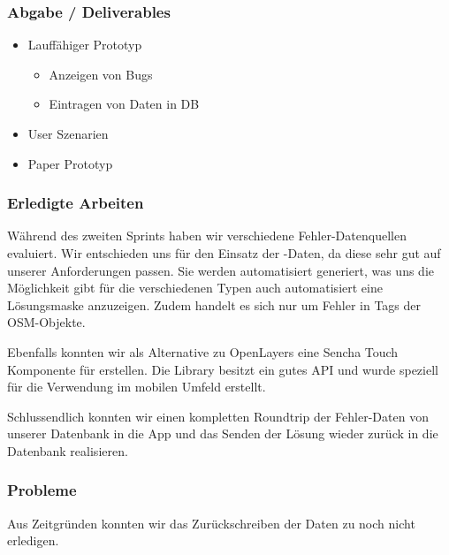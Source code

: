 \subsubsection{Abgabe / Deliverables}

\begin{itemize}
	\item Lauffähiger Prototyp
	\begin{itemize}
		\item Anzeigen von Bugs
		\item Eintragen von Daten in DB
	\end{itemize}
	\item User Szenarien
	\item Paper Prototyp
\end{itemize}

\subsubsection{Erledigte Arbeiten}
Während des zweiten Sprints haben wir verschiedene Fehler-Datenquellen evaluiert. Wir entschieden uns für den Einsatz der -Daten, da diese sehr gut auf unserer Anforderungen passen. Sie werden automatisiert generiert, was uns die Möglichkeit gibt für die verschiedenen Typen auch automatisiert eine Lösungsmaske anzuzeigen. Zudem handelt es sich nur um Fehler in Tags der OSM-Objekte.

Ebenfalls konnten wir als Alternative zu OpenLayers eine Sencha Touch Komponente für  erstellen.
Die Library besitzt ein gutes API und wurde speziell für die Verwendung im mobilen Umfeld erstellt.

Schlussendlich konnten wir einen kompletten Roundtrip der Fehler-Daten von unserer Datenbank in die App und das Senden der Lösung wieder zurück in die Datenbank realisieren.

\subsubsection{Probleme}
Aus Zeitgründen konnten wir das Zurückschreiben der Daten zu  noch nicht erledigen.